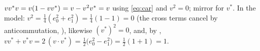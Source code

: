$v v^* v = v(1 - v v^*)^{\vphantom{*}} = v - v^2 v^* = v$ using \eqref{eq:car} and $v^2 = 0$; mirror for $v^*$. In the model: $v^2 = \tfrac14(e_0^2 + e_1^2) = \tfrac14(1 - 1) = 0$ (the cross terms cancel by anticommutation, ), likewise $(v^*)^2 = 0$, and, by , $v v^* + v^* v = 2\,(v \cdot v^*) = \tfrac12\bigl(e_0^2 - e_1^2\bigr) = \tfrac12(1 + 1) = 1$.
